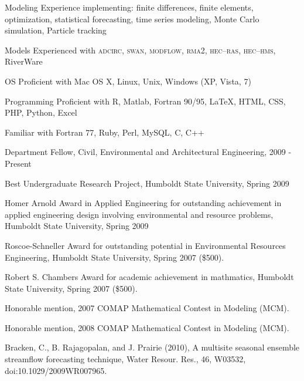 \documentclass[10pt,a4paper]{scrartcl}
\begin{document}
\begin{cv}{}
        \begin{cvlist}{}\label{skills}
            \item[Modeling] Experience implementing: finite differences, finite elements, optimization, statistical forecasting, time series modeling, Monte Carlo simulation, Particle tracking
            \item[Models] Experienced with \textsc{adcirc}, \textsc{swan}, \textsc{modflow}, \textsc{rma2}, \textsc{hec--ras}, \textsc{hec--hms}, RiverWare
            \item[OS] Proficient with Mac OS X, Linux, Unix, Windows (XP, Vista, 7)
            \item[Programming] Proficient with R, Matlab, Fortran 90/95, \LaTeX, HTML, CSS, PHP, Python, Excel
            \item Familiar with Fortran 77, Ruby, Perl, MySQL, C, C++
        \end{cvlist}
        
        \begin{cvlist}{}\label{awards}
            \item   Department Fellow, Civil, Environmental and Architectural Engineering, 2009 - Present
            \item   Best Undergraduate Research Project, Humboldt State University, Spring 2009
            \item   Homer Arnold Award in Applied Engineering for outstanding achievement in applied engineering design involving environmental and resource problems, Humboldt State University, Spring 2009 
            \item   Roscoe-Schneller Award for outstanding potential in Environmental Resources Engineering, Humboldt State University, Spring 2007 (\$500).

	        \item Robert S. Chambers Award for academic achievement in mathmatics, Humboldt State University, Spring 2007 (\$500).

	        \item Honorable mention, 2007 COMAP Mathematical Contest in Modeling (MCM).
	
	        \item Honorable mention, 2008 COMAP Mathematical Contest in Modeling (MCM).
        \end{cvlist}
        
        \begin{cvlist}{}\label{pub}
            \item   Bracken, C., B. Rajagopalan, and J. Prairie (2010), A multisite seasonal ensemble streamflow forecasting technique, Water Resour. Res., 46, W03532, doi:10.1029/2009WR007965.
        \end{cvlist}
    \end{cv}
\end{document}
